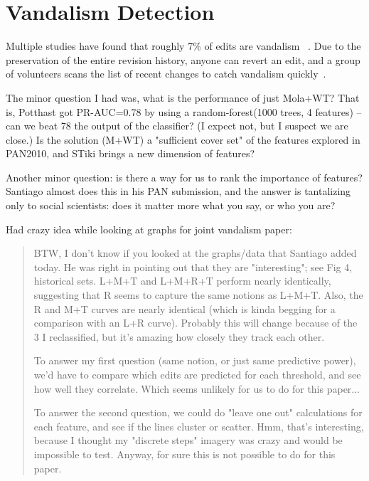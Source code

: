 
\chapter{Vandalism Detection}

Multiple studies have found that roughly 7\% of edits are
vandalism~\cite{Potthast2008,Potthast2010a} .
Due to the preservation of the entire revision history,
anyone can revert an edit, and a group of volunteers scans the
list of recent changes to catch vandalism
quickly~\cite{wiki:RCPatrol}.







The minor question I had was, what is the performance of just Mola+WT?
That is, Potthast got PR-AUC=0.78 by using a random-forest(1000 trees,
4 features) -- can we beat 78%
the output of the classifier?  (I expect not, but I suspect we are
close.)  Is the solution (M+WT) a "sufficient cover set" of the
features explored in PAN2010, and STiki brings a new dimension of
features?

Another minor question: is there a way for us to rank the importance
of features?  Santiago almost does this in his PAN submission, and the
answer is tantalizing only to social scientists: does it matter more
what you say, or who you are?

Had crazy idea while looking at graphs for joint vandalism paper:
\begin{quote}
BTW, I don't know if you looked at the graphs/data that Santiago added today.  He was right in pointing out that they are "interesting"; see Fig 4, historical sets.  L+M+T and L+M+R+T perform nearly identically, suggesting that R seems to capture the same notions as L+M+T.  Also, the R and M+T curves are nearly identical (which is kinda begging for a comparison with an L+R curve).  Probably this will change because of the 3 I reclassified, but it's amazing how closely they track each other.

To answer my first question (same notion, or just same predictive power), we'd have to compare which edits are predicted for each threshold, and see how well they correlate.  Which seems unlikely for us to do for this paper...

To answer the second question, we could do "leave one out" calculations for each feature, and see if the lines cluster or scatter.  Hmm, that's interesting, because I thought my "discrete steps" imagery was crazy and would be impossible to test.  Anyway, for sure this is not possible to do for this paper.
\end{quote}


